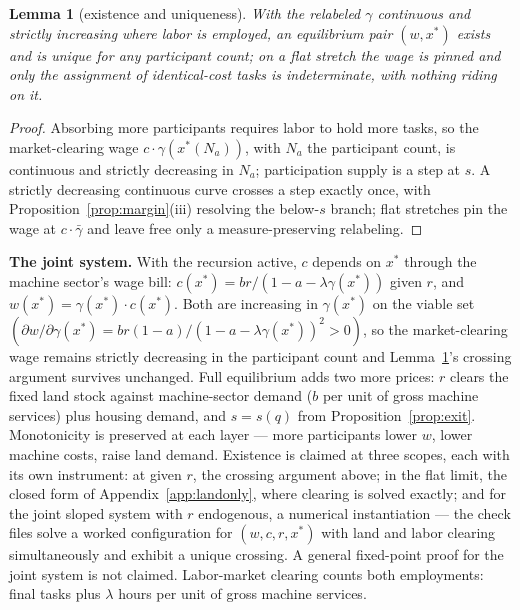 \documentclass[12pt]{article}
\theoremstyle{plain}
\newtheorem{lemma}[proposition]{Lemma}
\begin{document}
\begin{lemma}[existence and uniqueness]\label{lem:existence}
With the relabeled $\gamma$ continuous and strictly increasing where labor is employed, an equilibrium pair $(w, x^*)$ exists and is unique for any participant count; on a flat stretch the wage is pinned and only the assignment of identical-cost tasks is indeterminate, with nothing riding on it.
\end{lemma}

\begin{proof}
Absorbing more participants requires labor to hold more tasks, so the market-clearing wage $c\cdot \gamma (x^*(N_a))$, with $N_a$ the participant count, is continuous and strictly decreasing in $N_a$; participation supply is a step at $s$. A strictly decreasing continuous curve crosses a step exactly once, with Proposition~\ref{prop:margin}(iii) resolving the below-$s$ branch; flat stretches pin the wage at $c\cdot \bar{\gamma}$ and leave free only a measure-preserving relabeling.
\end{proof}

\textbf{The joint system.} With the recursion active, $c$ depends on $x^*$ through the machine sector's wage bill: $c(x^*) = br/(1 - a - \lambda \gamma (x^*))$ given $r$, and $w(x^*) = \gamma (x^*)\cdot c(x^*)$. Both are increasing in $\gamma (x^*)$ on the viable set $(\partial w/\partial \gamma (x^*) = br(1-a)/(1-a-\lambda \gamma (x^*))^2 > 0)$, so the market-clearing wage remains strictly decreasing in the participant count and Lemma~\ref{lem:existence}'s crossing argument survives unchanged. Full equilibrium adds two more prices: $r$ clears the fixed land stock against machine-sector demand ($b$ per unit of gross machine services) plus housing demand, and $s = s(q)$ from Proposition~\ref{prop:exit}. Monotonicity is preserved at each layer --- more participants lower $w$, lower machine costs, raise land demand. Existence is claimed at three scopes, each with its own instrument: at given $r$, the crossing argument above; in the flat limit, the closed form of Appendix~\ref{app:landonly}, where clearing is solved exactly; and for the joint sloped system with $r$ endogenous, a numerical instantiation --- the check files solve a worked configuration for $(w, c, r, x^*)$ with land and labor clearing simultaneously and exhibit a unique crossing. A general fixed-point proof for the joint system is not claimed. Labor-market clearing counts both employments: final tasks plus $\lambda$ hours per unit of gross machine services.
\end{document}
